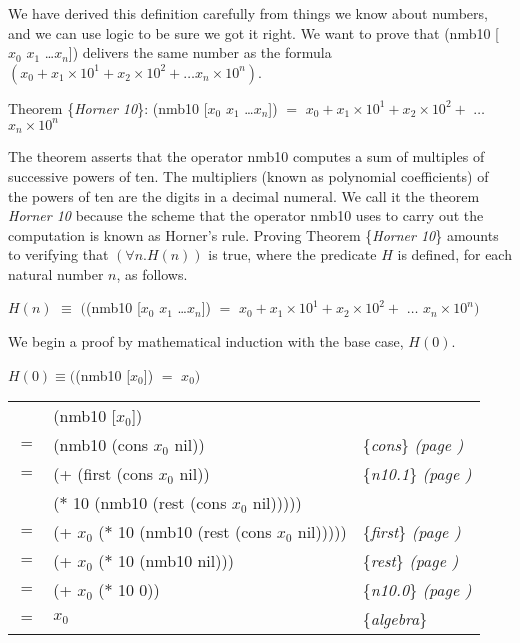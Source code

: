 We have derived this definition carefully
from things we know about numbers,
and we can use logic to be sure we got it right.
We want to prove that
\textsf{(nmb10 [$x_0$ $x_1$ \dots $x_{n}$])}
delivers the same number as the formula
$(x_0 + x_1 \times 10^1 + x_2 \times 10^2 + \dots x_{n} \times 10^{n})$.

\begin{center}
\label{horner10-thm}Theorem 
\{\emph{Horner 10}\}:
\textsf{(nmb10 [$x_0$ $x_1$ \dots $x_{n}$])} $=$
$x_0 + x_1 \times 10^1 + x_2 \times 10^2 +$ $\dots$ $x_{n} \times 10^{n}$
\end{center}

The theorem asserts that the operator \textsf{nmb10}
computes a sum of multiples of successive powers of ten.
The multipliers 
(known as polynomial coefficients) 
of the powers of ten are the digits in a decimal numeral.
We call it the theorem \emph{Horner 10} because
the scheme that the operator \textsf{nmb10} uses to carry out the computation is
known as Horner's rule.
Proving Theorem \{\emph{Horner 10}\} amounts to
verifying that $(\forall n.H(n))$ is true,
where the predicate $H$ is defined, for each natural number $n$,
as follows.
\begin{center}
$H(n)$ $\equiv$ $($\textsf{(nmb10 [$x_0$ $x_1$ \dots $x_{n}$])} $=$
$x_0 + x_1 \times 10^1 + x_2 \times 10^2 +$ $\dots$ $x_{n} \times 10^{n})$
\end{center}

We begin a proof by mathematical induction with the base case, $H(0)$.
\begin{center}
$H(0) \equiv ($\textsf{(nmb10 [$x_0$])} $=$ $x_0)$ \\
\begin{tabular}{rll}
\hline
    & \textsf{(nmb10 [$x_0$])}           & \\
$=$ & \textsf{(nmb10 (cons $x_0$ nil))}  & \{\emph{cons}\} \emph{(page \pageref{first-rest-cons})} \\
$=$ & \textsf{(+ (first (cons $x_0$ nil))}  & \{\emph{n10.1}\} \emph{(page \pageref{nmb10-defun})} \\
    & \phantom{\textsf{(+ }}\textsf{($*$ 10 (nmb10 (rest (cons $x_0$ nil)))))} &\\
$=$ & \textsf{(+ $x_0$ ($*$ 10 (nmb10 (rest (cons $x_0$ nil)))))}  & \{\emph{first}\} \emph{(page \pageref{first-rest-cons})} \\
$=$ & \textsf{(+ $x_0$ ($*$ 10 (nmb10 nil)))}  & \{\emph{rest}\} \emph{(page \pageref{first-rest-cons})} \\
$=$ & \textsf{(+ $x_0$ ($*$ 10 0))}  & \{\emph{n10.0}\} \emph{(page \pageref{nmb10-defun})} \\
$=$ & $x_0$  & \{\emph{algebra}\} \\
\end{tabular}
\end{center}

